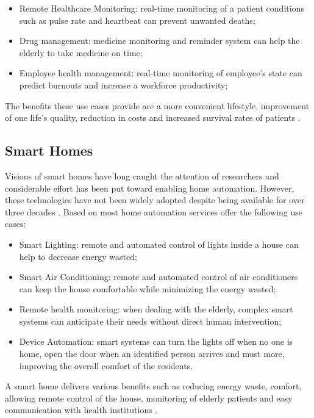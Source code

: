 \begin{itemize}
    \item Remote Healthcare Monitoring: real-time monitoring of a patient conditions such as pulse rate and heartbeat can prevent unwanted deaths;
    \item Drug management: medicine monitoring and reminder system can help the elderly to take medicine on time;
    \item Employee health management: real-time monitoring of employee's state can predict burnouts and increase a workforce productivity;
\end{itemize}

The benefits these use cases provide are a more convenient lifestyle, improvement of one life's quality, reduction in costs and increased survival rates of patients \parencite{iot-healthcare}.

\subsection{Smart Homes}
\label{subsec:stateofart:areas:home}

Visions of smart homes have long caught the attention of researchers and considerable effort has been put toward enabling home automation. However, these technologies have not been widely adopted despite being available for over three decades \parencite{iot-smarthomes}.
Based on \cite{smarthome-review} most home automation services offer the following use cases:

\begin{itemize}
    \item Smart Lighting: remote and automated control of lights inside a house can help to decrease energy wasted;
    \item Smart Air Conditioning: remote and automated control of air conditioners can keep the house comfortable while minimizing the energy wasted;
    \item Remote health monitoring: when dealing with the elderly, complex smart systems can anticipate their needs without direct human intervention;
    \item Device Automation: smart systems can turn the lights off when no one is home, open the door when an identified person arrives and must more, improving the overall comfort of the residents.
\end{itemize}

A smart home delivers various benefits such as reducing energy waste, comfort, allowing remote control of the house, monitoring of elderly patients and easy communication with health institutions \parencite{smarthome-review}.

